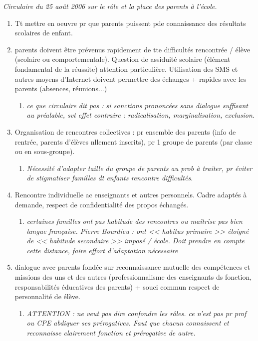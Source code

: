 \documentclass[12pt]{report}
\begin{document}
\begin{itemize}
\begin{itemize}
{\begin{minipage}{19cm}
\textit{Circulaire du 25 août 2006 sur le rôle et la place des parents à l'école.}

\begin{enumerate}
\item Tt mettre en oeuvre pr que parents puissent pde connaissance des résultats scolaires de enfant.\\

\item parents doivent être prévenus rapidement de tte difficultés rencontrée / élève (scolaire ou comportementale). Question de assiduité scolaire (élément fondamental de la réussite) attention particulière. Utilisation des SMS et autres moyens d'Internet doivent permettre des échanges + rapides avec les parents (absences, réunions...)
\begin{enumerate}
\item \textit{ce que circulaire dit pas : si sanctions prononcées sans dialogue suffisant au préalable, svt effet contraire : radicalisation, marginalisation, exclusion}.
\end{enumerate}

\item Organisation de rencontres collectives : pr ensemble des parents (info de rentrée, parents d'élèves nllement inscrits), pr 1 groupe de parents (par classe ou en sous-groupe).\\
\begin{enumerate}
\item \textit{Nécessité d'adapter taille du groupe de parents au prob à traiter, pr éviter de stigmatiser familles dt enfants rencontre difficultés.}
\end{enumerate}

\item Rencontre individuelle ac enseignants et autres personnels. Cadre adaptés à demande, respect de confidentialité des propos échangés. \\
\begin{enumerate}
\item \textit{certaines familles ont pas habitude des rencontres ou maîtrise pas bien langue française. Pierre Bourdieu : ont << habitus primaire >> éloigné de << habitude secondaire >> imposé / école. Doit prendre en compte cette distance, faire effort d'adaptation nécessaire}  \\
\end{enumerate}

\item dialogue avec parents fondée sur reconnaissance mutuelle des compétences et missions des uns et des autres (professionnalisme des enseignants ds fonction, responsabilités éducatives des parents) + souci commun respect de personnalité de élève.\\
\begin{enumerate}
\item \textit{ATTENTION : ne veut pas dire confondre les rôles. ce n'est pas pr prof ou CPE abdiquer ses prérogatives. Faut que chacun connaissent et reconnaisse clairement fonction et prérogative de autre.} \\
\end{enumerate}


\end{enumerate}
\end{minipage}}
\end{itemize}
\end{itemize}
\end{document}
